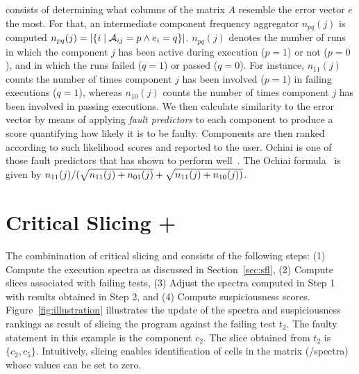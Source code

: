 \documentclass[sigplan,10pt,review,anonymous]{acmart}\settopmatter{printfolios=true,printccs=false,printacmref=false}
\begin{document}
consists of determining what columns of the matrix $A$ resemble the
error vector $e$ the most.  For that, an intermediate component
frequency aggregator $n_{pq}(j)$ is computed $n_{pq}(j) = |\{i\mid
\mathcal{A}_{ij}=p \wedge e_i=q\}|$. $n_{pq}(j)$ denotes the number of runs in
which the component $j$ has been active during execution ($p = 1$) or
not ($p=0$), and in which the runs failed ($q = 1$) or passed ($q =
0$).  For instance, $n_{11}(j)$ counts the number of times component
$j$ has been involved ($p = 1$) in failing executions ($q = 1$),
whereas $n_{10}(j)$ counts the number of times component $j$ has been
involved in passing executions. We then calculate similarity to the
error vector by means of applying \emph{fault predictors} to each
component to produce a score quantifying how likely it is to be
faulty.  Components are then ranked according to such likelihood
scores and reported to the user. Ochiai is one of those fault
predictors that has shown to perform well~. The Ochiai
formula~\cite{DBLP:conf/prdc/AbreuZG06} is given by
$n_{11}(j)/(\sqrt{n_{11}(j)+n_{01}(j)} + \sqrt{n_{11}(j)+n_{10}(j))}$.

\section{Critical Slicing + \sfl{}}
\label{sec:combination}

The combinination of critical slicing and \sfl{} consists of the
following steps: (1) Compute the execution spectra as discussed in
Section~\ref{sec:sfl}, (2) Compute slices associated with failing
tests, (3) Adjust the spectra computed in Step 1 with results obtained
in Step 2, and (4) Compute suspiciousness
scores. Figure~\ref{fig:illustration} illustrates the update of the
spectra and suspiciousness rankings as result of slicing the program
against the failing test $t_2$. The faulty statement in this example
is the component $c_2$.  The slice obtained from $t_2$ is $\{c_2,
c_5\}$.  Intuitively, slicing enables identification of cells in the
matrix (/spectra) whose values can be set to zero.

\end{document}
